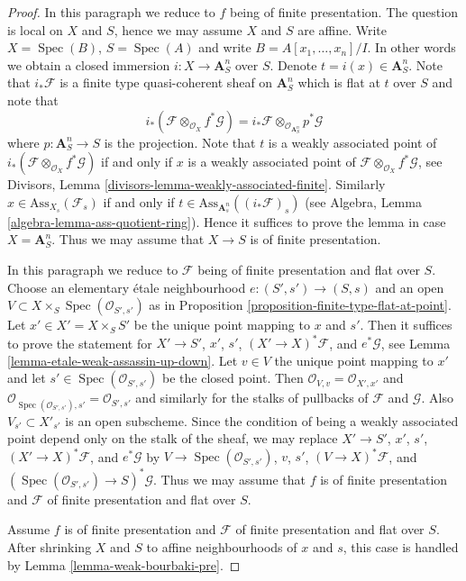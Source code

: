 \documentclass[10pt,a4paper]{amsart}
\theoremstyle{plain}
\theoremstyle{definition}
\theoremstyle{remark}
\numberwithin{equation}{subsection}
\def\Spec{\mathop{\mathrm{Spec}}}
\begin{document}
\begin{proof}
In this paragraph we reduce to $f$ being of finite presentation.
The question is local on $X$ and $S$, hence we may assume $X$ and $S$
are affine. Write $X = \Spec(B)$, $S = \Spec(A)$ and write
$B = A[x_1, \ldots, x_n]/I$. In other words we obtain a closed immersion
$i : X \to \mathbf{A}^n_S$ over $S$. Denote $t = i(x) \in \mathbf{A}^n_S$.
Note that $i_*\mathcal{F}$ is a finite type quasi-coherent sheaf on
$\mathbf{A}^n_S$ which is flat at $t$ over $S$ and note that
$$
i_*(\mathcal{F} \otimes_{\mathcal{O}_X} f^*\mathcal{G}) =
i_*\mathcal{F} \otimes_{\mathcal{O}_{\mathbf{A}^n_S}} p^*\mathcal{G}
$$
where $p : \mathbf{A}^n_S \to S$ is the projection. Note that
$t$ is a weakly associated point of
$i_*(\mathcal{F} \otimes_{\mathcal{O}_X} f^*\mathcal{G})$
if and only if $x$ is a weakly associated point of
$\mathcal{F} \otimes_{\mathcal{O}_X} f^*\mathcal{G}$, see
Divisors, Lemma \ref{divisors-lemma-weakly-associated-finite}.
Similarly $x \in \text{Ass}_{X_s}(\mathcal{F}_s)$ if and only
if $t \in \text{Ass}_{\mathbf{A}^n_s}((i_*\mathcal{F})_s)$ (see
Algebra, Lemma \ref{algebra-lemma-ass-quotient-ring}).
Hence it suffices to prove the lemma in case $X = \mathbf{A}^n_S$.
Thus we may assume that $X \to S$ is of finite presentation.

\medskip\noindent
In this paragraph we reduce to $\mathcal{F}$ being of finite presentation
and flat over $S$.
Choose an elementary \'etale neighbourhood $e : (S', s') \to (S, s)$
and an open $V \subset X \times_S \Spec(\mathcal{O}_{S', s'})$
as in Proposition \ref{proposition-finite-type-flat-at-point}.
Let $x' \in X' = X \times_S S'$ be the unique point mapping to $x$
and $s'$. Then it suffices to prove the statement for
$X' \to S'$, $x'$, $s'$, $(X' \to X)^*\mathcal{F}$, and $e^*\mathcal{G}$, see
Lemma \ref{lemma-etale-weak-assassin-up-down}.
Let $v \in V$ the unique point mapping to $x'$
and let $s' \in \Spec(\mathcal{O}_{S', s'})$ be the closed point.
Then $\mathcal{O}_{V, v} = \mathcal{O}_{X', x'}$
and $\mathcal{O}_{\Spec(\mathcal{O}_{S', s'}), s'} =
\mathcal{O}_{S', s'}$ and similarly for the stalks of pullbacks of
$\mathcal{F}$ and $\mathcal{G}$.
Also $V_{s'} \subset X'_{s'}$ is an open subscheme.
Since the condition of being a weakly associated point
depend only on the stalk of the sheaf, we may
replace
$X' \to S'$, $x'$, $s'$, $(X' \to X)^*\mathcal{F}$, and $e^*\mathcal{G}$
by
$V \to \Spec(\mathcal{O}_{S', s'})$, $v$, $s'$, $(V \to X)^*\mathcal{F}$,
and $(\Spec(\mathcal{O}_{S', s'}) \to S)^*\mathcal{G}$.
Thus we may assume that $f$ is of finite presentation and
$\mathcal{F}$ of finite presentation and flat over $S$.

\medskip\noindent
Assume $f$ is of finite presentation and
$\mathcal{F}$ of finite presentation and flat over $S$.
After shrinking $X$ and $S$ to affine neighbourhoods
of $x$ and $s$, this case is handled by
Lemma \ref{lemma-weak-bourbaki-pre}.
\end{proof}
\end{document}
